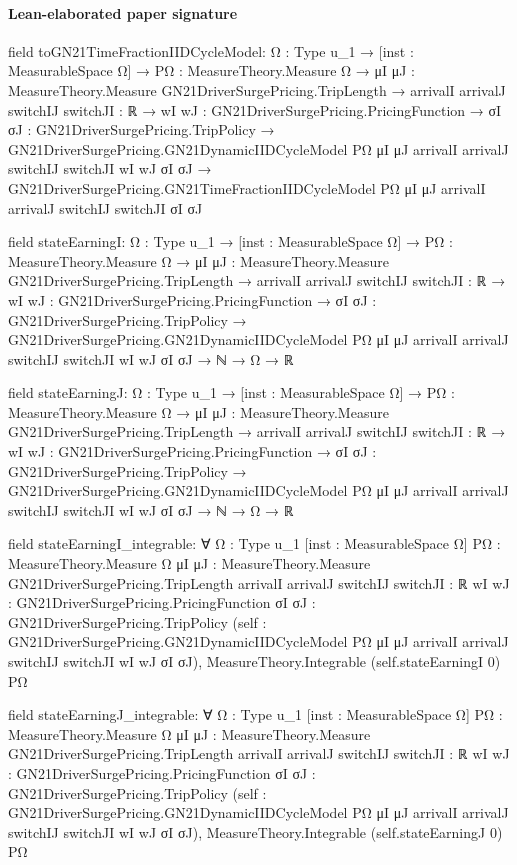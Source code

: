 \documentclass[10pt]{article}
\begin{document}
\paragraph{Lean-elaborated paper signature}
\begin{ReviewVerbatim}
field toGN21TimeFractionIIDCycleModel:
{Ω : Type u_1} →
  [inst : MeasurableSpace Ω] →
    {PΩ : MeasureTheory.Measure Ω} →
      {μI μJ : MeasureTheory.Measure GN21DriverSurgePricing.TripLength} →
        {arrivalI arrivalJ switchIJ switchJI : ℝ} →
          {wI wJ : GN21DriverSurgePricing.PricingFunction} →
            {σI σJ : GN21DriverSurgePricing.TripPolicy} →
              GN21DriverSurgePricing.GN21DynamicIIDCycleModel PΩ μI μJ arrivalI arrivalJ switchIJ switchJI wI wJ σI σJ →
                GN21DriverSurgePricing.GN21TimeFractionIIDCycleModel PΩ μI μJ arrivalI arrivalJ switchIJ switchJI σI σJ

field stateEarningI:
{Ω : Type u_1} →
  [inst : MeasurableSpace Ω] →
    {PΩ : MeasureTheory.Measure Ω} →
      {μI μJ : MeasureTheory.Measure GN21DriverSurgePricing.TripLength} →
        {arrivalI arrivalJ switchIJ switchJI : ℝ} →
          {wI wJ : GN21DriverSurgePricing.PricingFunction} →
            {σI σJ : GN21DriverSurgePricing.TripPolicy} →
              GN21DriverSurgePricing.GN21DynamicIIDCycleModel PΩ μI μJ arrivalI arrivalJ switchIJ switchJI wI wJ σI σJ →
                ℕ → Ω → ℝ

field stateEarningJ:
{Ω : Type u_1} →
  [inst : MeasurableSpace Ω] →
    {PΩ : MeasureTheory.Measure Ω} →
      {μI μJ : MeasureTheory.Measure GN21DriverSurgePricing.TripLength} →
        {arrivalI arrivalJ switchIJ switchJI : ℝ} →
          {wI wJ : GN21DriverSurgePricing.PricingFunction} →
            {σI σJ : GN21DriverSurgePricing.TripPolicy} →
              GN21DriverSurgePricing.GN21DynamicIIDCycleModel PΩ μI μJ arrivalI arrivalJ switchIJ switchJI wI wJ σI σJ →
                ℕ → Ω → ℝ

field stateEarningI_integrable:
∀ {Ω : Type u_1} [inst : MeasurableSpace Ω] {PΩ : MeasureTheory.Measure Ω}
  {μI μJ : MeasureTheory.Measure GN21DriverSurgePricing.TripLength} {arrivalI arrivalJ switchIJ switchJI : ℝ}
  {wI wJ : GN21DriverSurgePricing.PricingFunction} {σI σJ : GN21DriverSurgePricing.TripPolicy}
  (self : GN21DriverSurgePricing.GN21DynamicIIDCycleModel PΩ μI μJ arrivalI arrivalJ switchIJ switchJI wI wJ σI σJ),
  MeasureTheory.Integrable (self.stateEarningI 0) PΩ

field stateEarningJ_integrable:
∀ {Ω : Type u_1} [inst : MeasurableSpace Ω] {PΩ : MeasureTheory.Measure Ω}
  {μI μJ : MeasureTheory.Measure GN21DriverSurgePricing.TripLength} {arrivalI arrivalJ switchIJ switchJI : ℝ}
  {wI wJ : GN21DriverSurgePricing.PricingFunction} {σI σJ : GN21DriverSurgePricing.TripPolicy}
  (self : GN21DriverSurgePricing.GN21DynamicIIDCycleModel PΩ μI μJ arrivalI arrivalJ switchIJ switchJI wI wJ σI σJ),
  MeasureTheory.Integrable (self.stateEarningJ 0) PΩ


\end{ReviewVerbatim}
\end{document}
